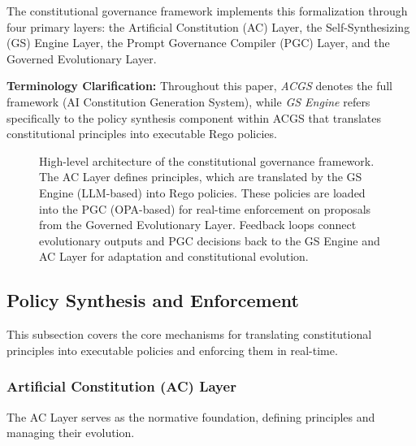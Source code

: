 \documentclass[sigconf,natbib]{acmart}
\begin{document}
The constitutional governance framework implements this formalization through four primary layers: the Artificial Constitution (AC) Layer, the Self-Synthesizing (GS) Engine Layer, the Prompt Governance Compiler (PGC) Layer, and the Governed Evolutionary Layer.

\textbf{Terminology Clarification:} Throughout this paper, \textit{ACGS} denotes the full framework (AI Constitution Generation System), while \textit{GS Engine} refers specifically to the policy synthesis component within ACGS that translates constitutional principles into executable Rego policies.

\begin{figure}[htbp]
  \centering
  \caption[High-level architecture diagram]{High-level architecture of the constitutional governance framework. The AC Layer defines principles, which are translated by the GS Engine (LLM-based) into Rego policies. These policies are loaded into the PGC (OPA-based) for real-time enforcement on proposals from the Governed Evolutionary Layer. Feedback loops connect evolutionary outputs and PGC decisions back to the GS Engine and AC Layer for adaptation and constitutional evolution.}
  \label{fig:architecture}
\end{figure}

\subsection{Policy Synthesis and Enforcement}
\label{subsec:policy_synthesis_enforcement}

This subsection covers the core mechanisms for translating constitutional principles into executable policies and enforcing them in real-time.

\subsubsection{Artificial Constitution (AC) Layer}
The AC Layer serves as the normative foundation, defining principles and managing their evolution.
\end{document}
